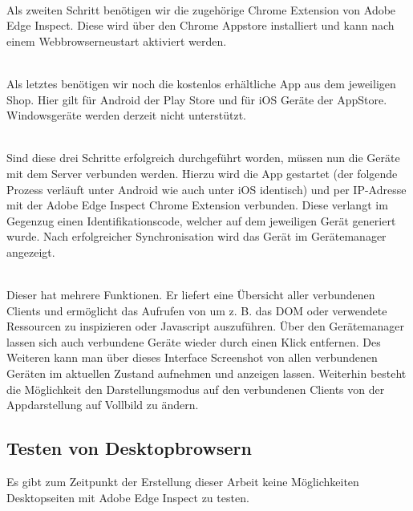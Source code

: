 		\\Als zweiten Schritt benötigen wir die zugehörige Chrome Extension von Adobe Edge Inspect. Diese wird über den Chrome \Gls{App}store installiert und kann nach einem \Gls{Webbrowser}neustart aktiviert werden.
		
		\\Als letztes benötigen wir noch die kostenlos erhältliche \Gls{App} aus dem jeweiligen Shop. Hier gilt für Android der Play Store und für iOS Geräte der \Gls{App}Store. Windowsgeräte werden derzeit nicht unterstützt.
		
		\\Sind diese drei Schritte erfolgreich durchgeführt worden, müssen nun die Geräte mit dem Server verbunden werden. Hierzu wird die \Gls{App} gestartet (der folgende Prozess verläuft unter Android wie auch unter iOS identisch) und per IP-Adresse mit der Adobe Edge Inspect Chrome Extension verbunden. Diese verlangt im Gegenzug einen Identifikationscode, welcher auf dem jeweiligen Gerät generiert wurde. Nach erfolgreicher Synchronisation wird das Gerät im Gerätemanager angezeigt.

		\\Dieser hat mehrere Funktionen. Er liefert eine Übersicht aller verbundenen Clients und ermöglicht das Aufrufen von  um z. B. das \Gls{DOM} oder verwendete Ressourcen zu inspizieren oder \Gls{Javascript} auszuführen. Über den Gerätemanager lassen sich auch verbundene Geräte wieder durch einen Klick entfernen. Des Weiteren kann man über dieses Interface Screenshot von allen verbundenen Geräten im aktuellen Zustand aufnehmen und anzeigen lassen. Weiterhin besteht die Möglichkeit den Darstellungsmodus auf den verbundenen Clients von der \Gls{App}darstellung auf Vollbild zu ändern.
		
		\subsection{Testen von Desktopbrowsern}
		Es gibt zum Zeitpunkt der Erstellung dieser Arbeit keine Möglichkeiten Desktopseiten mit Adobe Edge Inspect zu testen.
		
